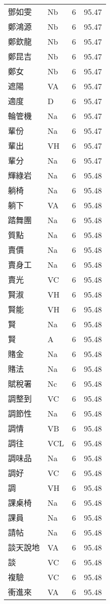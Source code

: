 \documentclass[twocolumn]{book}
\begin{document}
\begin{supertabular}{llrr}
鄧如雯 & Nb & 6 &  95.47\\
鄭鴻源 & Nb & 6 &  95.47\\
鄭欽龍 & Nb & 6 &  95.47\\
鄭昆吉 & Nb & 6 &  95.47\\
鄭女 & Nb & 6 &  95.47\\
遮陽 & VA & 6 &  95.47\\
適度 & D & 6 &  95.47\\
輪管機 & Na & 6 &  95.47\\
輩份 & Na & 6 &  95.47\\
輩出 & VH & 6 &  95.47\\
輩分 & Na & 6 &  95.47\\
輝綠岩 & Na & 6 &  95.48\\
躺椅 & Na & 6 &  95.48\\
躺下 & VA & 6 &  95.48\\
踏舞團 & Na & 6 &  95.48\\
質點 & Na & 6 &  95.48\\
賣價 & Na & 6 &  95.48\\
賣身工 & Na & 6 &  95.48\\
賣光 & VC & 6 &  95.48\\
賢淑 & VH & 6 &  95.48\\
賢能 & VH & 6 &  95.48\\
賢 & Na & 6 &  95.48\\
賢 & A & 6 &  95.48\\
賭金 & Na & 6 &  95.48\\
賭法 & Na & 6 &  95.48\\
賦稅署 & Nc & 6 &  95.48\\
調整到 & VC & 6 &  95.48\\
調節性 & Na & 6 &  95.48\\
調情 & VB & 6 &  95.48\\
調往 & VCL & 6 &  95.48\\
調味品 & Na & 6 &  95.48\\
調好 & VC & 6 &  95.48\\
調 & VH & 6 &  95.48\\
課桌椅 & Na & 6 &  95.48\\
課員 & Na & 6 &  95.48\\
請帖 & Na & 6 &  95.48\\
談天說地 & VA & 6 &  95.48\\
談 & VC & 6 &  95.48\\
複驗 & VC & 6 &  95.48\\
衝進來 & VA & 6 &  95.48\\

\end{supertabular}
\end{document}
